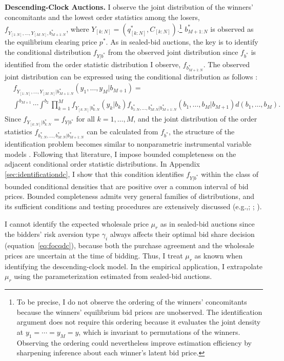 \documentclass[12pt]{article}
\theoremstyle{definition} %
\begin{document}
\textbf{Descending-Clock Auctions.} I observe the joint distribution of the winners' concomitants and the lowest order statistics among the losers, $f_{Y_{[1:N]},\dots,Y_{[M:N]},b_{M+1:N}^\ast} $, where $Y_{[k:N]} = (q_{[k:N]}^\ast, C_{[k:N]}) $.\footnote{To be precise, I do not observe the ordering of the winners' concomitants because the winners' equilibrium bid prices are unobserved. The identification argument does not require this ordering because it evaluates the joint density at $y_1=\cdots=y_M=y$, which is invariant to permutations of the winners. Observing the ordering could nevertheless improve estimation efficiency by sharpening inference about each winner's latent bid price.} $b_{M+1:N}^\ast$ is observed as the equilibrium clearing price $p^\ast $. As in sealed-bid auctions, the key is to identify the conditional distribution $f_{Y|b^\ast}$ from the observed joint distribution since $f_{b^\ast}$ is identified from the order statistic distribution I observe, $f_{b_{M+1:N}^\ast} $. The observed joint distribution can be expressed using the conditional distribution as follows \citep{Yang1977}:
\begin{align}
\label{eq:identificationdc}
&f_{Y_{[1:N]},\dots,Y_{[M:N]}|b_{M+1:N}^\ast}(y_1,\dots,y_M|b_{M+1}) = \nonumber\\
& \int^{b_{M+1}} \cdots \int^{b_2} \prod_{k=1}^M f_{Y_{[k:N]}|b_{k:N}^\ast}(y_k|b_k) f_{b_{1:N}^\ast,\dots,b_{M:N}^\ast|b_{M+1:N}^\ast}(b_1,\dots,b_M|b_{M+1}) d(b_1,\dots,b_M).
\end{align}
Since $f_{Y_{[k:N]}|b_{k:N}^\ast} = f_{Y|b^\ast} $ for all $k = 1,\dots,M $, and the joint distribution of the order statistics $f_{b_{1:N}^\ast,\dots,b_{M:N}^\ast|b_{M+1:N}^\ast} $ can be calculated from $f_{b^\ast}$, the structure of the identification problem becomes similar to nonparametric instrumental variable models \citep{Newey2003}. Following that literature, I impose bounded completeness on the adjacent conditional order statistic distributions. In Appendix \ref{sec:identificationdc}, I show that this condition identifies \(f_{Y|b^\ast}\) within the class of bounded conditional densities that are positive over a common interval of bid prices. Bounded completeness admits very general families of distributions, and its sufficient conditions and testing procedures are extensively discussed (e.g.,\citealp*{Blundell2007}; \citealp{Hu2008}; \citealp{Freyberger2017}).

I cannot identify the expected wholesale price $\mu_r $ as in sealed-bid auctions since the bidders' risk aversion type $\gamma_i $ always affects their optimal bid share decision (equation~\eqref{eq:focqdc}), because both the purchase agreement and the wholesale prices are uncertain at the time of bidding. Thus, I treat $\mu_r $ as known when identifying the descending-clock model. In the empirical application, I extrapolate $\mu_r $ using the parameterization estimated from sealed-bid auctions.
\end{document}
